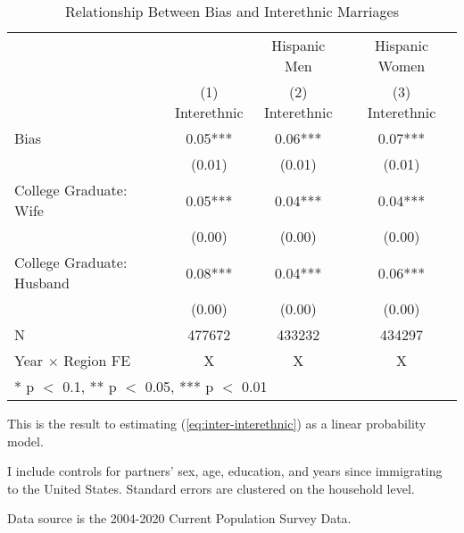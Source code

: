 \begin{table}[H]

\caption{Relationship Between Bias and Interethnic Marriages \label{regtab-logit-02}}
\centering
\begin{threeparttable}
\begin{tabular}[t]{lccc}
\toprule
\multicolumn{2}{c}{ } & \multicolumn{1}{c}{Hispanic Men} & \multicolumn{1}{c}{Hispanic Women} \\
\cmidrule(l{3pt}r{3pt}){3-3} \cmidrule(l{3pt}r{3pt}){4-4}
  & \specialcell{(1) \\ Interethnic} & \specialcell{(2) \\ Interethnic} & \specialcell{(3) \\ Interethnic}\\
\midrule
Bias & \num{0.05}*** & \num{0.06}*** & \num{0.07}***\\
 & (\num{0.01}) & (\num{0.01}) & (\num{0.01})\\
College Graduate: Wife & \num{0.05}*** & \num{0.04}*** & \num{0.04}***\\
 & (\num{0.00}) & (\num{0.00}) & \vphantom{1} (\num{0.00})\\
College Graduate: Husband & \num{0.08}*** & \num{0.04}*** & \num{0.06}***\\
 & (\num{0.00}) & (\num{0.00}) & (\num{0.00})\\
\midrule
N & \num{477672} & \num{433232} & \num{434297}\\
Year $\times$ Region FE & X & X & X\\
\bottomrule
\multicolumn{4}{l}{\rule{0pt}{1em}* p $<$ 0.1, ** p $<$ 0.05, *** p $<$ 0.01}\\
\end{tabular}
\begin{tablenotes}
\small
\item[1] \footnotesize{This is the result to estimating (\ref{eq:inter-interethnic}) as a
                      linear probability model.}
\item[2] \footnotesize{I include controls for partners' sex, age, education, 
                      and years since immigrating to the United States.
                      Standard errors are clustered on the household level.}
\item[3] \footnotesize{Data source is the 2004-2020 Current Population Survey Data.}
\end{tablenotes}
\end{threeparttable}
\end{table}
